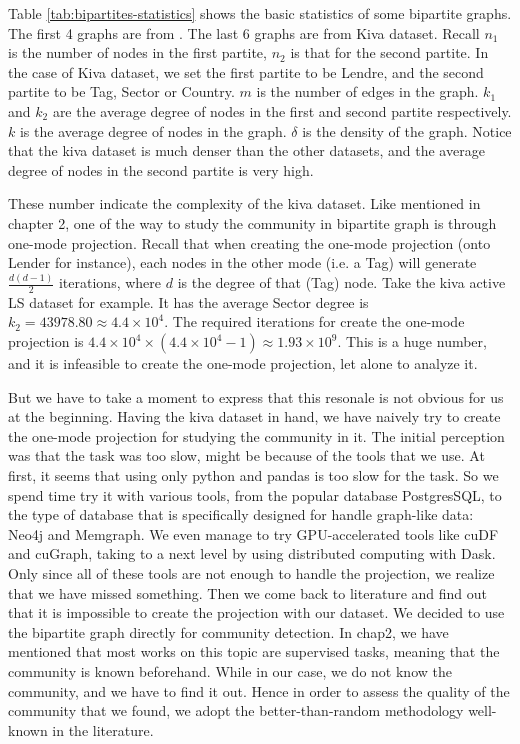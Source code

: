Table \ref{tab:bipartites-statistics} shows the basic statistics of some bipartite graphs.
The first 4 graphs are from \parencite{latapy2006}.
The last 6 graphs are from Kiva dataset.
Recall $n_1$ is the number of nodes in the first partite, $n_2$ is that for the second partite.
In the case of Kiva dataset, we set the first partite to be Lendre, and the second partite to be Tag, Sector or Country.
$m$ is the number of edges in the graph.
$k_1$ and $k_2$ are the average degree of nodes in the first and second partite respectively.
$k$ is the average degree of nodes in the graph.
$\delta$ is the density of the graph.
Notice that the kiva dataset is much denser than the other datasets,
and the average degree of nodes in the second partite is very high.

These number indicate the complexity of the kiva dataset.
Like mentioned in chapter 2, one of the way to study the community in bipartite graph is through one-mode projection.
Recall that when creating the one-mode projection (onto Lender for instance),
each nodes in the other mode (i.e. a Tag) will generate $\frac{d(d-1)}{2}$ iterations,
where $d$ is the degree of that (Tag) node.
Take the kiva active LS dataset for example.
It has the average Sector degree is $k_2=43978.80 \approx 4.4\times 10^4$.
The required iterations for create the one-mode projection is
$4.4\times 10^4 \times (4.4\times 10^4 - 1) \approx 1.93 \times 10^9$.
This is a huge number, and it is infeasible to create the one-mode projection, let alone to analyze it.

But we have to take a moment to express that this resonale is not obvious for us at the beginning.
Having the kiva dataset in hand, we have naively try to create the one-mode projection for studying the community in it.
The initial perception was that the task was too slow, might be because of the tools that we use.
At first, it seems that using only python and pandas is too slow for the task.
So we spend time try it with various tools, from the popular database PostgresSQL,
to the type of database that is specifically designed for handle graph-like data: Neo4j and Memgraph.
We even manage to try GPU-accelerated tools like cuDF and cuGraph,
taking to a next level by using distributed computing with Dask.
Only since all of these tools are not enough to handle the projection,
we realize that we have missed something.
Then we come back to literature and find out that it is impossible to create the projection with our dataset.
We decided to use the bipartite graph directly for community detection.
In chap2, we have mentioned that most works on this topic are supervised tasks,
meaning that the community is known beforehand.
While in our case, we do not know the community, and we have to find it out.
Hence in order to assess the quality of the community that we found,
we adopt the better-than-random methodology well-known in the literature.


